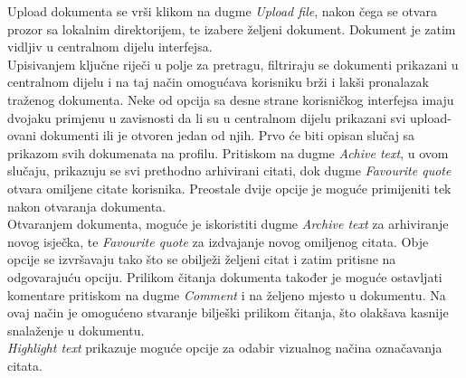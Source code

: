 Upload dokumenta se vrši klikom na dugme \textit{Upload file}, nakon čega se otvara prozor sa lokalnim direktorijem, te izabere željeni dokument. Dokument je zatim vidljiv u centralnom dijelu interfejsa.\\ Upisivanjem ključne riječi u polje za pretragu, filtriraju se dokumenti prikazani u centralnom dijelu i na taj način omogućava korisniku brži i lakši pronalazak traženog dokumenta. Neke od opcija sa desne strane korisničkog interfejsa imaju dvojaku primjenu u zavisnosti da li su u centralnom dijelu prikazani svi upload-ovani dokumenti ili je otvoren jedan od njih. Prvo će biti opisan slučaj sa prikazom svih dokumenata na profilu. Pritiskom na dugme \textit{Achive text}, u ovom slučaju, prikazuju se svi prethodno arhivirani citati, dok dugme \textit{Favourite quote} otvara omiljene citate korisnika. Preostale dvije opcije je moguće primijeniti tek nakon otvaranja dokumenta. \\ Otvaranjem dokumenta, moguće je iskoristiti dugme \textit{Archive text} za arhiviranje novog isječka, te \textit{Favourite quote} za izdvajanje novog omiljenog citata. Obje opcije se izvršavaju tako što se obilježi željeni citat i zatim pritisne na odgovarajuću opciju. Prilikom čitanja dokumenta također je moguće ostavljati komentare pritiskom na dugme \textit{Comment} i na željeno mjesto u dokumentu. Na ovaj način je omogućeno stvaranje bilješki prilikom čitanja, što olakšava kasnije snalaženje u dokumentu. \\ \textit{Highlight text} prikazuje moguće opcije za odabir vizualnog načina označavanja citata.

